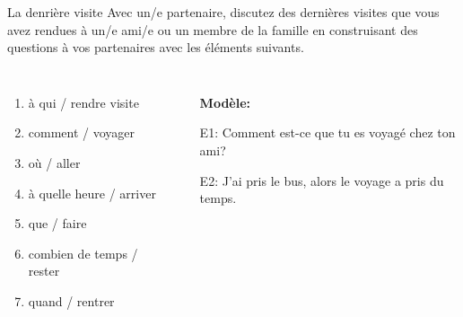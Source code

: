 \begin{frame}{La denrière visite}
  Avec un/e partenaire, discutez des dernières visites que vous avez rendues à un/e ami/e ou un membre de la famille en construisant des questions à vos partenaires avec les éléments suivants.
  \vspace{0.25cm}
  \begin{columns}
      \begin{enumerate}
        \item à qui / rendre visite
        \item comment / voyager
        \item où / aller
        \item à quelle heure / arriver
        \item que / faire
        \item combien de temps / rester
        \item quand / rentrer
      \end{enumerate}
      \begin{itemize}
        \item[] \textbf{Modèle:}
        \item[E1:] Comment est-ce que tu es voyagé chez ton ami?
        \item[E2:] J'ai pris le bus, alors le voyage a pris du temps.
      \end{itemize}
  \end{columns}
\end{frame}